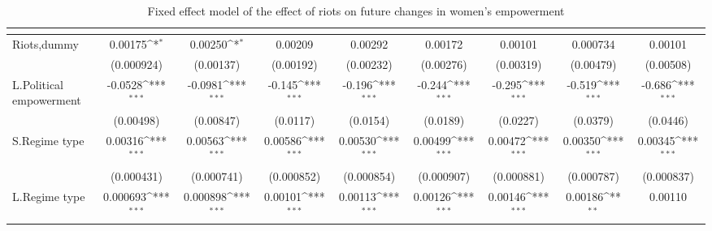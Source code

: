 \begin{table}[htbp]\centering
\def\sym#1{\ifmmode^{#1}\else\(^{#1}\)\fi}
\caption{Fixed effect model of the effect of riots on future changes in women's empowerment \label{fepolemriotnowar}}
\begin{tabular}{l*{8}{c}}
\hline\hline
                    &&&&&&&&\\
\hline
Riots,dummy         &     0.00175\sym{*}  &     0.00250\sym{*}  &     0.00209         &     0.00292         &     0.00172         &     0.00101         &    0.000734         &     0.00101         \\
                    &  (0.000924)         &   (0.00137)         &   (0.00192)         &   (0.00232)         &   (0.00276)         &   (0.00319)         &   (0.00479)         &   (0.00508)         \\
[1em]
L.Political empowerment&     -0.0528\sym{***}&     -0.0981\sym{***}&      -0.145\sym{***}&      -0.196\sym{***}&      -0.244\sym{***}&      -0.295\sym{***}&      -0.519\sym{***}&      -0.686\sym{***}\\
                    &   (0.00498)         &   (0.00847)         &    (0.0117)         &    (0.0154)         &    (0.0189)         &    (0.0227)         &    (0.0379)         &    (0.0446)         \\
[1em]
S.Regime type       &     0.00316\sym{***}&     0.00563\sym{***}&     0.00586\sym{***}&     0.00530\sym{***}&     0.00499\sym{***}&     0.00472\sym{***}&     0.00350\sym{***}&     0.00345\sym{***}\\
                    &  (0.000431)         &  (0.000741)         &  (0.000852)         &  (0.000854)         &  (0.000907)         &  (0.000881)         &  (0.000787)         &  (0.000837)         \\
[1em]
L.Regime type       &    0.000693\sym{***}&    0.000898\sym{***}&     0.00101\sym{***}&     0.00113\sym{***}&     0.00126\sym{***}&     0.00146\sym{***}&     0.00186\sym{**} &     0.00110         \\

\end{tabular}
\end{table}
